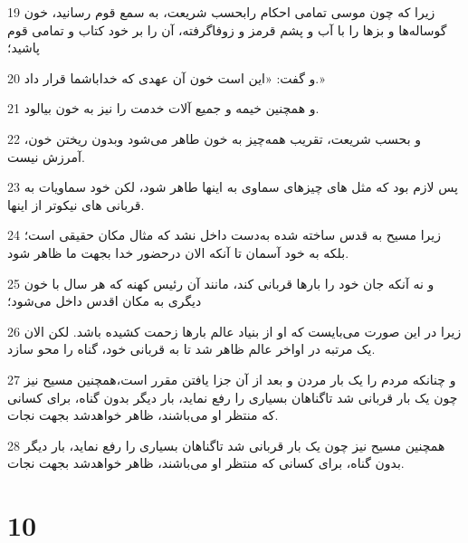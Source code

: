\par 19 زیرا که چون موسی تمامی احکام رابحسب شریعت، به سمع قوم رسانید، خون گوساله‌ها و بزها را با آب و پشم قرمز و زوفاگرفته، آن را بر خود کتاب و تمامی قوم پاشید؛
\par 20 و گفت: «این است خون آن عهدی که خداباشما قرار داد.»
\par 21 و همچنین خیمه و جمیع آلات خدمت را نیز به خون بیالود.
\par 22 و بحسب شریعت، تقریب همه‌چیز به خون طاهر می‌شود وبدون ریختن خون، آمرزش نیست.
\par 23 پس لازم بود که مثل های چیزهای سماوی به اینها طاهر شود، لکن خود سماویات به قربانی های نیکوتر از اینها.
\par 24 زیرا مسیح به قدس ساخته شده به‌دست داخل نشد که مثال مکان حقیقی است؛ بلکه به خود آسمان تا آنکه الان درحضور خدا بجهت ما ظاهر شود.
\par 25 و نه آنکه جان خود را بارها قربانی کند، مانند آن رئیس کهنه که هر سال با خون دیگری به مکان اقدس داخل می‌شود؛
\par 26 زیرا در این صورت می‌بایست که او از بنیاد عالم بارها زحمت کشیده باشد. لکن الان یک مرتبه در اواخر عالم ظاهر شد تا به قربانی خود، گناه را محو سازد.
\par 27 و چنانکه مردم را یک بار مردن و بعد از آن جزا یافتن مقرر است،همچنین مسیح نیز چون یک بار قربانی شد تاگناهان بسیاری را رفع نماید، بار دیگر بدون گناه، برای کسانی که منتظر او می‌باشند، ظاهر خواهدشد بجهت نجات.
\par 28 همچنین مسیح نیز چون یک بار قربانی شد تاگناهان بسیاری را رفع نماید، بار دیگر بدون گناه، برای کسانی که منتظر او می‌باشند، ظاهر خواهدشد بجهت نجات.

\chapter{10}

